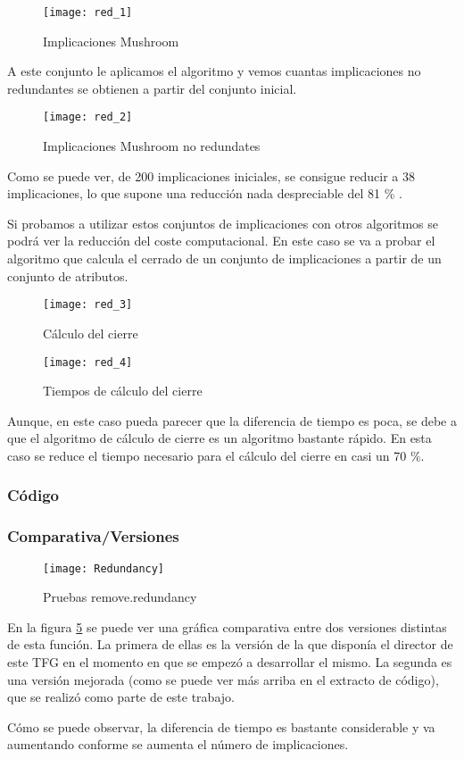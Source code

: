 \begin{figure}[H]
    \centering
    \texttt{[image: red\_1]}
    \caption{Implicaciones Mushroom}
    \label{fig:red_1}
\end{figure} 

A este conjunto le aplicamos el algoritmo y vemos cuantas implicaciones no redundantes se obtienen a partir del conjunto inicial.

\begin{figure}[H]
    \centering
    \texttt{[image: red\_2]}
    \caption{Implicaciones Mushroom no redundates}
    \label{fig:red_2}
\end{figure} 

Como se puede ver, de 200 implicaciones iniciales, se consigue reducir a 38 implicaciones, lo que supone una reducci\'on nada despreciable del 81 \% .

Si probamos a utilizar estos conjuntos de implicaciones con otros algoritmos se podr\'a ver la reducci\'on del coste computacional. En este caso se va a probar el algoritmo que calcula el cerrado de un conjunto de implicaciones a partir de un conjunto de atributos.

\begin{figure}[H]
    \centering
    \texttt{[image: red\_3]}
    \caption{C\'alculo del cierre}
    \label{fig:red_3}
\end{figure}

\begin{figure}[H]
    \centering
    \texttt{[image: red\_4]}
    \caption{Tiempos de c\'alculo del cierre}
    \label{fig:red_4}
\end{figure}

Aunque, en este caso pueda parecer que la diferencia de tiempo es poca, se debe a que el algoritmo de c\'alculo de cierre es un algoritmo bastante r\'apido. En esta caso se reduce el tiempo necesario para el c\'alculo del cierre en casi un 70 \%.

\newpage
\subsubsection{C\'odigo} 

\newpage
 
\subsubsection{Comparativa/Versiones} 
\begin{figure}[h]
    \centering
    \texttt{[image: Redundancy]}
    \caption{Pruebas remove.redundancy}
    \label{fig:redundancy}
\end{figure} 

En la figura \ref{fig:redundancy} se puede ver una gr\'afica comparativa entre dos versiones distintas de esta funci\'on. La primera de ellas es la versi\'on de la que dispon\'ia el director de este TFG en el momento en que se empez\'o a desarrollar el mismo. La segunda es una versi\'on mejorada (como se puede ver m\'as arriba en el extracto de c\'odigo), que se realiz\'o como parte de este trabajo.

C\'omo se puede observar, la diferencia de tiempo es bastante considerable y va aumentando conforme se aumenta el n\'umero de implicaciones.